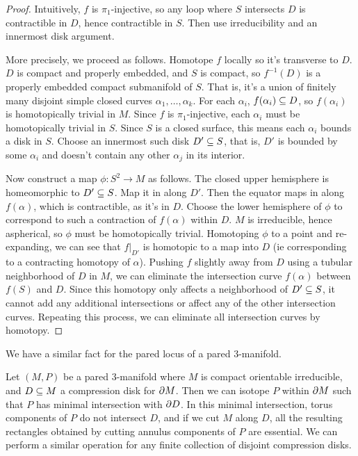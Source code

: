 \begin{proof}

Intuitively, $f$ is $\pi_1$-injective, so any loop where $S$ intersects $D$ is
contractible in $D$, hence contractible in $S$. Then use irreducibility and an
innermost disk argument.

More precisely, we proceed as follows. Homotope $f$ locally so it's transverse
to $D$. $D$ is compact and properly embedded, and $S$ is compact, so
$f^{-1}(D)$ is a properly embedded compact submanifold of $S$. That is, it's
a union of finitely many disjoint simple closed curves
$\alpha_1,\dots,\alpha_k$.  For each $\alpha_i$, $f(\alpha_i) \subseteq D$, so
$f(\alpha_i)$ is homotopically trivial in $M$.  Since $f$ is $\pi_1$-injective,
each $\alpha_i$ must be homotopically trivial in $S$.  Since $S$ is a closed
surface, this means each $\alpha_i$ bounds a disk in $S$.  Choose an innermost
such disk $D' \subseteq S$, that is, $D'$ is bounded by some $\alpha_i$ and doesn't
contain any other $\alpha_j$ in its interior.

Now construct a map $\phi \colon S^2 \to M$ as follows. The closed upper
hemisphere is homeomorphic to $D' \subseteq S$. Map it in along $D'$. Then the
equator maps in along $f(\alpha)$, which is contractible, as it's in $D$.
Choose the lower hemisphere of $\phi$ to correspond to such a contraction of
$f(\alpha)$ within $D$.  $M$ is irreducible, hence aspherical, so $\phi$ must
be homotopically trivial.  Homotoping $\phi$ to a point and re-expanding, we
can see that $f|_{D'}$ is homotopic to a map into $D$ (ie corresponding to
a contracting homotopy of $\alpha$). Pushing $f$ slightly away from $D$ using
a tubular neighborhood of $D$ in $M$, we can eliminate the intersection curve
$f(\alpha)$ between $f(S)$ and $D$.  Since this homotopy only affects
a neighborhood of $D' \subseteq S$, it cannot add any additional intersections or
affect any of the other intersection curves.  Repeating this process, we can
eliminate all intersection curves by homotopy.

\end{proof}

We have a similar fact for the pared locus of a pared $3$-manifold.

\begin{prop}\label{P:pared1}

Let $(M,P)$ be a pared $3$-manifold where $M$ is compact orientable
irreducible, and $D \subseteq M$ a compression disk for $\partial M$. Then we can isotope
$P$ within $\partial M$ such that $P$ has minimal intersection with $\partial D$. In this
minimal intersection, torus components of $P$ do not intersect $D$, and if we
cut $M$ along $D$, all the resulting rectangles obtained by cutting annulus
components of $P$ are essential.  We can perform a similar operation for any
finite collection of disjoint compression disks.

\end{prop}

